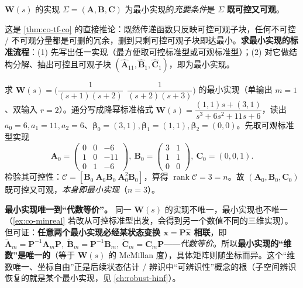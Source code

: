 \begin{theorem}\label{thm:co-minreal}
$\mathbf{W}(s)$ 的实现 $\Sigma=(\mathbf{A},\mathbf{B},\mathbf{C})$ 为最小实现的\emph{充要条件}是 $\Sigma$ \textbf{既可控又可观}\cite{liubao2006modern}。
\end{theorem}

\noindent 这是 \cref{thm:co-tf-co} 的直接推论：既然传递函数只反映可控可观子块，任何不可控 / 不可观分量都是可删的冗余，删到只剩可控可观子块即达最小。\textbf{求最小实现的标准流程}\cite{liubao2006modern}：(1) 先写出任一实现（最方便取可控标准型或可观标准型）；(2) 对它做结构分解、抽出可控且可观子块 $(\hat{\mathbf{A}}_{11},\hat{\mathbf{B}}_1,\hat{\mathbf{C}}_1)$，即为最小实现。

\begin{example}[一个传递函数阵的最小实现]\label{ex:co-minreal}
求 $\mathbf{W}(s)=\Big(\dfrac{1}{(s+1)(s+2)}\ \ \dfrac{1}{(s+2)(s+3)}\Big)$ 的最小实现（单输出 $m=1$、双输入 $r=2$）。通分写成降幂标准格式 $\mathbf{W}(s)=\dfrac{(1,1)s+(3,1)}{s^3+6s^2+11s+6}$，读出 $a_0=6,a_1=11,a_2=6$、$\boldsymbol{\beta}_0=(3,1),\boldsymbol{\beta}_1=(1,1),\boldsymbol{\beta}_2=(0,0)$。先取可观标准型实现
\[
  \mathbf{A}_0=\begin{pmatrix}0&0&-6\\1&0&-11\\0&1&-6\end{pmatrix},\
  \mathbf{B}_0=\begin{pmatrix}3&1\\1&1\\0&0\end{pmatrix},\
  \mathbf{C}_0=(0,0,1).
\]
检验其可控性：$\mathcal{C}=[\mathbf{B}_0\ \mathbf{A}_0\mathbf{B}_0\ \mathbf{A}_0^2\mathbf{B}_0]$，算得 $\operatorname{rank}\mathcal{C}=3=n$。故 $(\mathbf{A}_0,\mathbf{B}_0,\mathbf{C}_0)$ 既可控又可观，\emph{本身即最小实现}（$n=3$）\cite{liubao2006modern}。
\end{example}

\begin{insight}
\textbf{最小实现唯一到“代数等价”。}\;
同一 $\mathbf{W}(s)$ 的实现不唯一，最小实现也不唯一（\cref{ex:co-minreal} 若改从可控标准型出发，会得到另一个数值不同的三维实现）。但可证：\textbf{任意两个最小实现必经某状态变换 $\mathbf{x}=\mathbf{P}\hat{\mathbf{x}}$ 相联}，即 $\tilde{\mathbf{A}}_m=\mathbf{P}^{-1}\mathbf{A}_m\mathbf{P},\ \tilde{\mathbf{B}}_m=\mathbf{P}^{-1}\mathbf{B}_m,\ \tilde{\mathbf{C}}_m=\mathbf{C}_m\mathbf{P}$——\emph{代数等价}\cite{liubao2006modern}。所以\textbf{最小实现的“维数”是唯一的}（等于 $\mathbf{W}(s)$ 的 McMillan 度），具体矩阵则随坐标而异。这个“维数唯一、坐标自由”正是后续状态估计 / 辨识中“可辨识性”概念的根（子空间辨识恢复的就是某个最小实现，见 \cref{ch:robust-hinf}）。
\end{insight}

